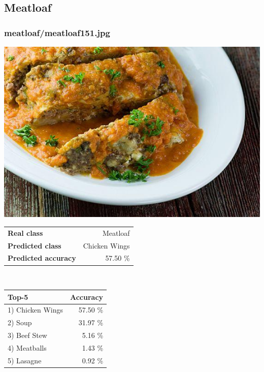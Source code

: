 \subsection{Meatloaf}
    
\subsubsection{meatloaf/meatloaf151.jpg}

\begin{minipage}[t]{0.4\textwidth}
	\vspace{0pt}
	\includegraphics[width=\linewidth]{images/evaluation-images/meatloaf/meatloaf151.jpg}
\end{minipage}
\hfill
\begin{minipage}[t]{0.5\textwidth}
	\vspace{0pt}\raggedright
	\begin{tabularx}{\textwidth}{X r}
		\small \textbf{Real class} & \small Meatloaf\\
		\small \textbf{Predicted class} & \small Chicken Wings\\
		\small \textbf{Predicted accuracy} & \small 57.50 \%
    \end{tabularx}\\
    
    \vspace{6pt}
	\begin{tabularx}{\textwidth}{X r}
        \small \textbf{Top-5} & \small \textbf{Accuracy} \\
        \hline
		\small 1) Chicken Wings & \small 57.50 \%\\\small 2) Soup & \small 31.97 \%\\\small 3) Beef Stew & \small 5.16 \%\\\small 4) Meatballs & \small 1.43 \%\\\small 5) Lasagne & \small 0.92 \%
    \end{tabularx}
\end{minipage}
    
